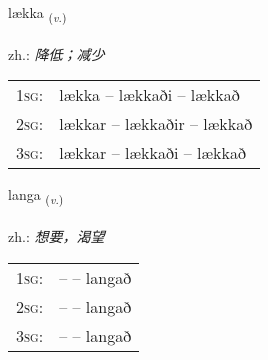 \documentclass[frontgrid, backgrid]{flacards}\usepackage[]{graphicx}\usepackage[]{xcolor}
\begin{document}
\renewcommand{\blhead}{\vskip5pt {\small\bfseries\footnotesize Sagnorð | 动词 }}
\renewcommand{\bcfoot}{\vskip5pt \hspace{2pt}{\small\bfseries\footnotesize 1K}}


{lækka \small{\textsubscript{(\textit{v.})}} \\[1ex] %
\textphonetic{[laihka]} \\
zh.: \emph{降低；减少} \\  [2ex]
\renewcommand*{\arraystretch}{0.8}
\begin{tabular}{p{1cm}l}
\textsc{1sg}: & lækka -- lækkaði -- lækkað \\ 
\textsc{2sg}: & lækkar -- lækkaðir -- lækkað \\ 
\textsc{3sg}: & lækkar -- lækkaði -- lækkað \\ 
\end{tabular}
}

\renewcommand{\flhead}{\vskip5pt \fboxsep=0pt {\small\bfseries\footnotesize Sagnorð | 动词}}
\renewcommand{\fcfoot}{\vskip5pt \fboxsep=0pt \hspace{2pt}{\small\bfseries\footnotesize 1K}}

\renewcommand{\blhead}{\vskip5pt {\small\bfseries\footnotesize Sagnorð | 动词 }}
\renewcommand{\bcfoot}{\vskip5pt \hspace{2pt}{\small\bfseries\footnotesize 1K}}


{langa \small{\textsubscript{(\textit{v.})}} \\[1ex] %
\textphonetic{[lauŋka]} \\
zh.: \emph{想要，渴望} \\  [2ex]
\renewcommand*{\arraystretch}{0.8}
\begin{tabular}{p{1cm}l}
\textsc{1sg}: &  --  -- langað \\ 
\textsc{2sg}: &  --  -- langað \\ 
\textsc{3sg}: &  --  -- langað \\ 
\end{tabular}
}

\renewcommand{\flhead}{\vskip5pt \fboxsep=0pt {\small\bfseries\footnotesize Lýsingarorð | 形容词}}
\renewcommand{\fcfoot}{\vskip5pt \fboxsep=0pt \hspace{2pt}{\small\bfseries\footnotesize 1K}}
\end{document}
